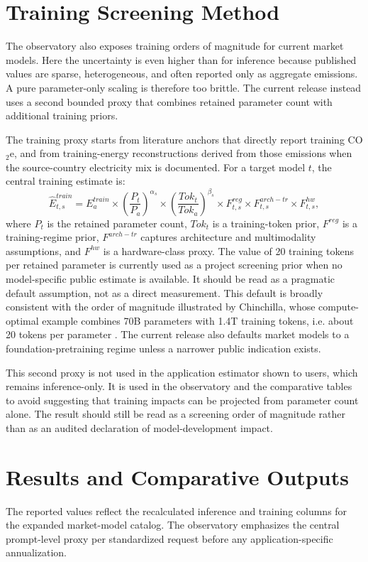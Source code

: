 \documentclass[runningheads]{llncs}
\begin{document}
\section{Training Screening Method}
The observatory also exposes training orders of magnitude for current market models. Here the uncertainty is even higher than for inference because published values are sparse, heterogeneous, and often reported only as aggregate emissions. A pure parameter-only scaling is therefore too brittle. The current release instead uses a second bounded proxy that combines retained parameter count with additional training priors.

The training proxy starts from literature anchors that directly report training CO$_2$e, and from training-energy reconstructions derived from those emissions when the source-country electricity mix is documented. For a target model $t$, the central training estimate is:
\begin{equation}
\hat{E}^{train}_{t,s} = E^{train}_a \times \left(\frac{P_t}{P_a}\right)^{\alpha_s}
\times \left(\frac{Tok_t}{Tok_a}\right)^{\beta_s}
\times F^{reg}_{t,s} \times F^{arch-tr}_{t,s} \times F^{hw}_{t,s},
\end{equation}
where $P_t$ is the retained parameter count, $Tok_t$ is a training-token prior, $F^{reg}$ is a training-regime prior, $F^{arch-tr}$ captures architecture and multimodality assumptions, and $F^{hw}$ is a hardware-class proxy. The value of 20 training tokens per retained parameter is currently used as a project screening prior when no model-specific public estimate is available. It should be read as a pragmatic default assumption, not as a direct measurement. This default is broadly consistent with the order of magnitude illustrated by Chinchilla, whose compute-optimal example combines 70B parameters with 1.4T training tokens, i.e. about 20 tokens per parameter \cite{hoffmann2022chinchilla}. The current release also defaults market models to a foundation-pretraining regime unless a narrower public indication exists.

This second proxy is not used in the application estimator shown to users, which remains inference-only. It is used in the observatory and the comparative tables to avoid suggesting that training impacts can be projected from parameter count alone. The result should still be read as a screening order of magnitude rather than as an audited declaration of model-development impact.

\section{Results and Comparative Outputs}
The reported values reflect the recalculated inference and training columns for the expanded market-model catalog. The observatory emphasizes the central prompt-level proxy per standardized request before any application-specific annualization.
\end{document}
